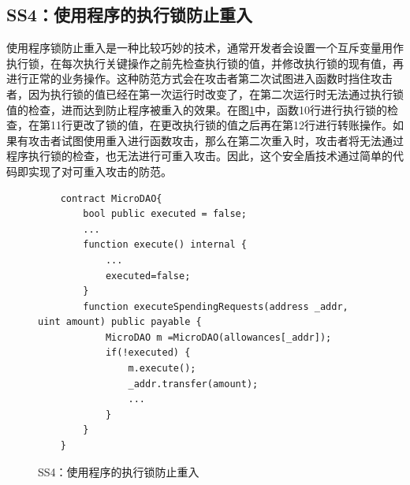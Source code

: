 \subsection{SS4：使用程序的执行锁防止重入}
使用程序锁防止重入是一种比较巧妙的技术，通常开发者会设置一个互斥变量用作执行锁，在每次执行关键操作之前先检查执行锁的值，并修改执行锁的现有值，再进行正常的业务操作。这种防范方式会在攻击者第二次试图进入函数时挡住攻击者，因为执行锁的值已经在第一次运行时改变了，在第二次运行时无法通过执行锁值的检查，进而达到防止程序被重入的效果。在图\ref{fig:ss4_example}中，函数10行进行执行锁的检查，在第11行更改了锁的值，在更改执行锁的值之后再在第12行进行转账操作。如果有攻击者试图使用重入进行函数攻击，那么在第二次重入时，攻击者将无法通过程序执行锁的检查，也无法进行可重入攻击。因此，这个安全盾技术通过简单的代码即实现了对可重入攻击的防范。
\begin{figure}
\begin{minipage}[htbp]{1.0\linewidth}
    \begin{lstlisting}
    contract MicroDAO{
        bool public executed = false;
        ...
        function execute() internal {
            ...
            executed=false;		
        }
        function executeSpendingRequests(address _addr, uint amount) public payable {
            MicroDAO m =MicroDAO(allowances[_addr]);
            if(!executed) {
                m.execute();
                _addr.transfer(amount);
                ...
            }
        }
    }
    \end{lstlisting}
\end{minipage}
\vspace{-5mm}
\caption{SS4：使用程序的执行锁防止重入}
\label{fig:ss4_example}
\end{figure}

